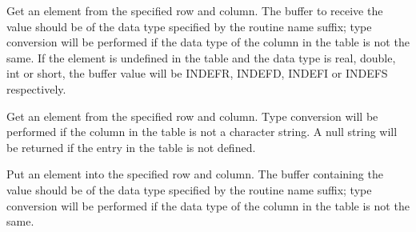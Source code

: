 Get an element from the specified row and column.
The buffer to receive the value should be of
the data type specified by the routine name suffix;
type conversion will be performed
if the data type of the column in the table is not the same.
If the element is undefined in the table
and the data type is real, double, int or short,
the buffer value will be INDEFR, INDEFD, INDEFI or INDEFS respectively.

\callseqtable

\begin{callseq}
\end{callseq}

Get an element from the specified row and column.
Type conversion will be performed if the column in the table is not
a character string.
A null string will be returned if the entry in the table is not defined.

\callseqtable

\begin{callseq}
\end{callseq}

Put an element into the specified row and column.
The buffer containing the value should be of
the data type specified by the routine name suffix;
type conversion will be performed
if the data type of the column in the table is not the same.

\callseqtable

\begin{callseq}
\end{callseq}

